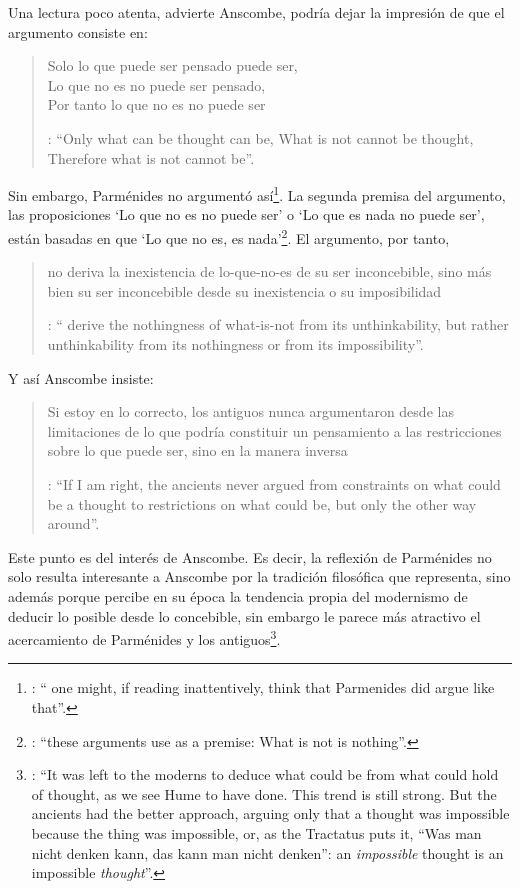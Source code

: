 Una lectura poco atenta, advierte Anscombe, podría dejar la impresión de que el argumento consiste en: \blockquote[{\Cite[vii]{anscombe1981parmenides}}: \enquote{Only what can be thought can be, What is not cannot be thought, Therefore what is not cannot be}.]{Solo lo que puede ser pensado puede ser,\\
Lo que no es no puede ser pensado,\\
Por tanto lo que no es no puede ser}. Sin embargo, Parménides no argumentó así\footnote{\cite[Cf.][6]{anscombe1981parmenides:pmc}: \enquote{\textelp{} one might, if reading inattentively, think that Parmenides did argue like that}.}. La segunda premisa del argumento, las proposiciones \enquote*{Lo que no es no puede ser} o \enquote*{Lo que es nada no puede ser}, están basadas en que \enquote*{Lo que no es, es nada}\footnote{\cite[Cf.][vii]{anscombe1981parmenides}: \enquote{these arguments \textelp{} use as a premise: What is not is nothing}.}. El argumento, por tanto, \blockquote[{\Cite[vii]{anscombe1981parmenides}}: \enquote{ derive the nothingness of what-is-not from its unthinkability, but rather unthinkability from its nothingness or from its impossibility}.]{no deriva la inexistencia de lo-que-no-es de su ser inconcebible, sino más bien su ser inconcebible desde su inexistencia o su imposibilidad}. Y así Anscombe insiste: \blockquote[{\Cite[viii]{anscombe1981parmenides}}: \enquote{If I am right, the ancients never argued from constraints on what could be a thought to restrictions on what could be, but only the other way around}.]{Si estoy en lo correcto, los antiguos nunca argumentaron desde las limitaciones de lo que podría constituir un pensamiento a las restricciones sobre lo que puede ser, sino en la manera inversa}. Este punto es del interés de Anscombe. Es decir, la reflexión de Parménides no solo resulta interesante a Anscombe por la tradición filosófica que representa, sino además porque percibe en su época la tendencia propia del modernismo de deducir lo posible desde lo concebible, sin embargo le parece más atractivo el acercamiento de Parménides y los antiguos\footnote{\cite[xi]{anscombe1981parmenides}: \enquote{It was left to the moderns to deduce what could be from what could hold of thought, as we see Hume to have done. This trend is still strong. But the ancients had the better approach, arguing only that a thought was impossible because the thing was impossible, or, as the Tractatus puts it, ``Was man nicht denken kann, das kann man nicht denken'': an \emph{impossible} thought is an impossible \emph{thought}}.}.

